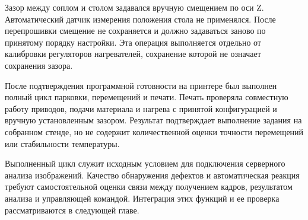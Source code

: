 Зазор между соплом и столом задавался вручную смещением по оси Z. Автоматический датчик измерения положения стола не применялся. После перепрошивки смещение не сохраняется и должно задаваться заново по принятому порядку настройки. Эта операция выполняется отдельно от калибровки регуляторов нагревателей, сохранение которой не означает сохранения зазора.

После подтверждения программной готовности на принтере был выполнен полный цикл парковки, перемещений и печати. Печать проверяла совместную работу приводов, подачи материала и нагрева с принятой конфигурацией и вручную установленным зазором. Результат подтверждает выполнение задания на собранном стенде, но не содержит количественной оценки точности перемещений или стабильности температуры.

Выполненный цикл служит исходным условием для подключения серверного анализа изображений. Качество обнаружения дефектов и автоматическая реакция требуют самостоятельной оценки связи между получением кадров, результатом анализа и управляющей командой. Интеграция этих функций и ее проверка рассматриваются в следующей главе.

